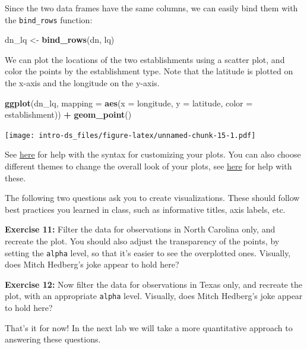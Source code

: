 \documentclass[]{book}
\newenvironment{Shaded}{\begin{snugshade}}{\end{snugshade}}
\newcommand{\KeywordTok}[1]{\textcolor[rgb]{0.13,0.29,0.53}{\textbf{#1}}}
\newcommand{\DataTypeTok}[1]{\textcolor[rgb]{0.13,0.29,0.53}{#1}}
\newcommand{\StringTok}[1]{\textcolor[rgb]{0.31,0.60,0.02}{#1}}
\newcommand{\OperatorTok}[1]{\textcolor[rgb]{0.81,0.36,0.00}{\textbf{#1}}}
\newcommand{\NormalTok}[1]{#1}
\theoremstyle{definition}
\theoremstyle{definition}
\theoremstyle{definition}
\theoremstyle{remark}
\begin{document}
Since the two data frames have the same columns, we can easily bind them
with the \texttt{bind\_rows} function:

\begin{Shaded}
\begin{Highlighting}[]
\NormalTok{dn_lq <-}\StringTok{ }\KeywordTok{bind_rows}\NormalTok{(dn, lq)}
\end{Highlighting}
\end{Shaded}

We can plot the locations of the two establishments using a scatter
plot, and color the points by the establishment type. Note that the
latitude is plotted on the x-axis and the longitude on the y-axis.

\begin{Shaded}
\begin{Highlighting}[]
\KeywordTok{ggplot}\NormalTok{(dn_lq, }\DataTypeTok{mapping =} \KeywordTok{aes}\NormalTok{(}\DataTypeTok{x =}\NormalTok{ longitude, }\DataTypeTok{y =}\NormalTok{ latitude, }\DataTypeTok{color =}\NormalTok{ establishment)) }\OperatorTok{+}
\StringTok{  }\KeywordTok{geom_point}\NormalTok{()}
\end{Highlighting}
\end{Shaded}

\texttt{[image: intro-ds\_files/figure-latex/unnamed-chunk-15-1.pdf]}

See \href{http://ggplot2.tidyverse.org/reference/labs.html}{here} for
help with the syntax for customizing your plots. You can also choose
different themes to change the overall look of your plots, see
\href{http://ggplot2.tidyverse.org/reference/ggtheme.html}{here} for
help with these.

The following two questions ask you to create visualizations. These
should follow best practices you learned in class, such as informative
titles, axis labels, etc.

\textbf{Exercise 11:} Filter the data for observations in North Carolina
only, and recreate the plot. You should also adjust the transparency of
the points, by setting the \texttt{alpha} level, so that it's easier to
see the overplotted ones. Visually, does Mitch Hedberg's joke appear to
hold here?

\textbf{Exercise 12:} Now filter the data for observations in Texas
only, and recreate the plot, with an appropriate \texttt{alpha} level.
Visually, does Mitch Hedberg's joke appear to hold here?

That's it for now! In the next lab we will take a more quantitative
approach to answering these questions.


\end{document}
